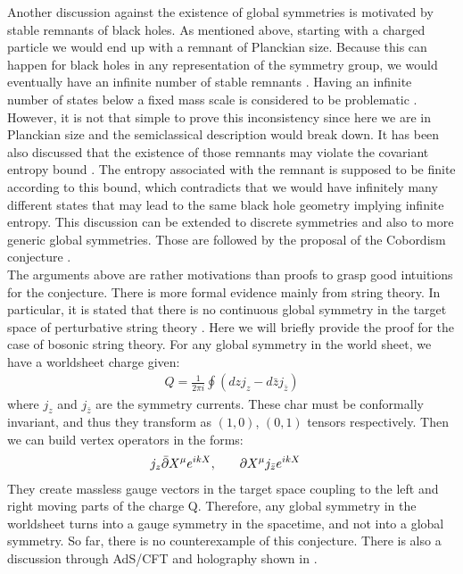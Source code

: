 \indent Another discussion against the existence of global symmetries is motivated by stable remnants of black holes. As mentioned above, starting with a charged particle we would end up with a remnant of Planckian size. Because this can happen for black holes in any representation of the symmetry group, we would eventually have an infinite number of stable remnants \parencite{grana_swampland_2021}. Having an infinite number of states below a fixed mass scale is considered to be problematic \parencite{susskind_trouble_1995}. However, it is not that simple to prove this inconsistency since here we are in Planckian size and the semiclassical description would break down. It has been also discussed that the existence of those remnants may violate the covariant entropy bound \parencite{banks_symmetries_2011}. The entropy associated with the remnant is supposed to be finite according to this bound, which contradicts that we would have infinitely many different states that may lead to the same black hole geometry implying infinite entropy.
This discussion can be extended to discrete symmetries and also to more generic global symmetries. Those are followed by the proposal of the Cobordism conjecture \parencite{mcnamara_cobordism_2019}.  \\
\indent The arguments above are rather motivations than proofs to grasp good intuitions for the conjecture. There is more formal evidence mainly from string theory. In particular, it is stated that there is no continuous global symmetry in the target space of perturbative string theory \parencite{polchinski_string_1998-1}. Here we will briefly provide the proof for the case of bosonic string theory. For any global symmetry in the world sheet, we have a worldsheet charge given:
\begin{align}
    Q = \frac{1}{2\pi i} \oint (dzj_{z} - d\bar{z} j_{\bar{z}})
\end{align}
where $j_{z}$ and $j_{\bar{z}}$ are the symmetry currents. These char must be conformally invariant, and thus they transform as $(1,0)$, $(0,1)$ tensors respectively. Then we can build vertex operators in the forms:
\begin{align}
    j_{z}\bar{\partial} X^{\mu}e^{ikX} ,& \qq{} \partial X^{\mu} j_{\bar{z}}e^{ikX}
\end{align}
They create massless gauge vectors in the target space coupling to the left and right moving parts of the charge Q. Therefore, any global symmetry in the worldsheet turns into a gauge symmetry in the spacetime, and not into a global symmetry. So far, there is no counterexample of this conjecture. There is also a discussion through AdS/CFT and holography shown in \parencite{harlow_symmetries_2021, harlow_constraints_2019,harlow_tasi_2018}.  \\
